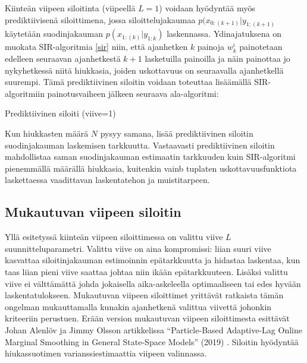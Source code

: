 \documentclass[
  12pt,
  a4paper, twoside]{book}
\begin{document}
Kiinteän viipeen siloitinta (viipeellä \(L=1\)) voidaan hyödyntää myös prediktiivisenä siloittimena, jossa siloittelujakaumaa \(p(x_{0:(k+1)}|y_{1:(k+1)}\) käytetään suodinjakauman \(p(x_{1:(k)}|y_{1:k})\) laskennassa. \citep{Nyobe-2021} Ydinajatuksena on muokata SIR-algoritmia \ref{sir} niin, että ajanhetken \(k\) painoja \(w_k^i\) painotetaan edelleen seuraavan ajanhetkestä \(k+1\) lasketuilla painoilla ja näin painottaa jo nykyhetkessä niitä hiukkasia, joiden uskottavuus on seuraavalla ajanhetkellä suurempi. Tämä prediktiivinen siloitin voidaan toteuttaa lisäämällä SIR-algoritmiin painotusvaiheen jälkeen seuraava ala-algoritmi:

\begin{algorithm}[H]
\label{prediktiivinen-siloitin}
\DontPrintSemicolon
\SetAlgoShortEnd
{}
\caption{Prediktiivinen siloiti (viive=1)}
\end{algorithm}

Kun hiukkasten määrä \(N\) pysyy samana, lisää prediktiivinen siloitin suodinjakauman laskemisen tarkkuutta. Vastaavasti prediktiivinen siloitin mahdollistaa saman suodinjakauman estimaatin tarkkuuden kuin SIR-algoritmi pienemmällä määrällä hiukkasia, kuitenkin vainb tuplaten uskottavuusfunktiota laskettaessa vaadittavan laskentatehon ja muistitarpeen.

\subsection{Mukautuvan viipeen siloitin}

Yllä esitetyssä kiinteän viipeen siloittimessa on valittu viive \(L\) suunnitteluparametri. Valittu viive on aina kompromissi: liian suuri viive kasvattaa siloitinjakauman estimoinnin epätarkkuutta ja hidastaa laskentaa, kun taas liian pieni viive saattaa johtaa niin ikään epätarkkuuteen. Lisäksi valittu viive ei välttämättä johda jokaisella aika-askeleella optimaaliseen tai edes hyvään laskentatulokseen. Mukautuvan viipeen siloittimet yrittävät ratkaista tämän ongelman mukauttamalla kunakin ajanhetkenä valittua viivettä johonkin kriteeriin perustuen. Erään version mukautuvan viipeen siloittimesta esittävät Johan Alenlöv ja Jimmy Olsson artikkelissa ``Particle-Based Adaptive-Lag Online Marginal Smoothing in General State-Space Models'' (2019) \citep{alenlov-2019}. Siloitin hyödyntää hiukassuotimen varianssiestimaattia viipeen valinnassa.
\end{document}
